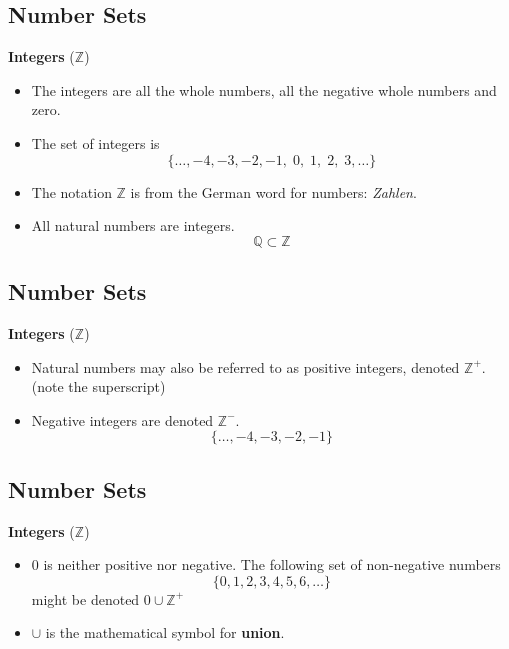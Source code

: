 \documentclass[]{report}
\begin{document}
\begin{enumerate}


\subsection{Number Sets}


\textbf{Integers} ($\mathbb{Z}$)
\begin{itemize}
\item The integers are all the whole numbers, all the negative whole numbers and zero.

\item The set of integers is 
\[\{\ldots,-4,-3,-2,-1,\;0,\;1,\;2,\;3,\ldots\} \]
\item The notation $\mathbb{Z}$ is from the German word for numbers: \textit{Zahlen}. 
\item All natural numbers are integers.
\[ \mathbb{Q}  \subset \mathbb{Z}\]
\end{itemize}



\subsection{Number Sets}

\textbf{Integers} ($\mathbb{Z}$)
\begin{itemize}
\item Natural numbers may also be referred to as positive integers, denoted $\mathbb{Z}^{+}$. \\(note the superscript)
\item Negative integers are denoted $\mathbb{Z}^{-}$.
\[\{\ldots,-4,-3,-2,-1\}\]
\end{itemize}



\subsection{Number Sets}

\textbf{Integers} ($\mathbb{Z}$)
\begin{itemize}
\item 0 is neither positive nor negative. The following set of non-negative numbers \[\{0,1,2,3,4,5,6,\ldots\} \] might be denoted $0 \cup \mathbb{Z}^{+}$
\item $\cup$ is the mathematical symbol for \textbf{union}.
\end{itemize}




\end{enumerate}
\end{document}
